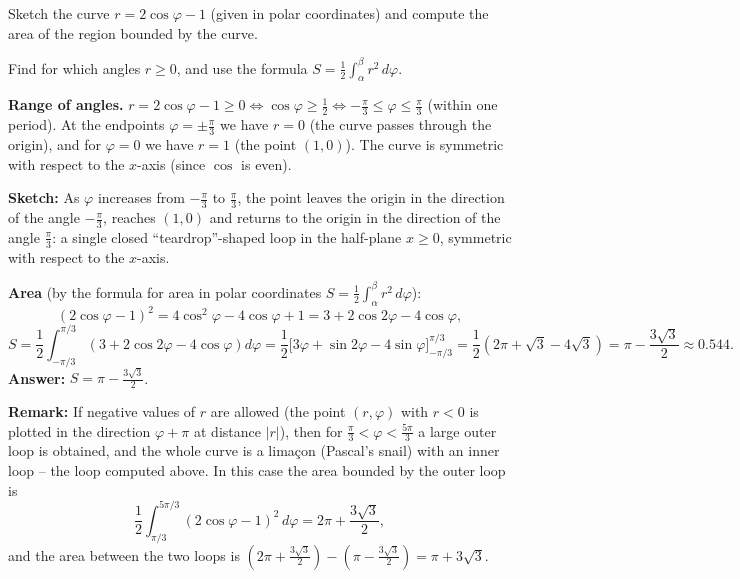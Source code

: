 
\begin{question}
Sketch the curve $r=2\cos\varphi-1$ (given in polar coordinates) and compute the area of the region bounded by the curve.
\end{question}

\begin{hint}
Find for which angles $r\ge0$, and use the formula $S=\frac12\int_\alpha^\beta r^2\,d\varphi$.
\end{hint}

\begin{solution}
\textbf{Range of angles.} $r=2\cos\varphi-1\ge0\iff\cos\varphi\ge\frac12\iff -\frac\pi3\le\varphi\le\frac\pi3$ (within one period). At the endpoints $\varphi=\pm\frac\pi3$ we have $r=0$ (the curve passes through the origin), and for $\varphi=0$ we have $r=1$ (the point $(1,0)$). The curve is symmetric with respect to the $x$-axis (since $\cos$ is even).

\textbf{Sketch:} As $\varphi$ increases from $-\frac\pi3$ to $\frac\pi3$, the point leaves the origin in the direction of the angle $-\frac\pi3$, reaches $(1,0)$ and returns to the origin in the direction of the angle $\frac\pi3$: a single closed ``teardrop''-shaped loop in the half-plane $x\ge0$, symmetric with respect to the $x$-axis.

\textbf{Area} (by the formula for area in polar coordinates $S=\frac12\int_\alpha^\beta r^2\,d\varphi$):
\[
(2\cos\varphi-1)^2=4\cos^2\varphi-4\cos\varphi+1=3+2\cos2\varphi-4\cos\varphi,
\]
\[
S=\frac12\int_{-\pi/3}^{\pi/3}\left(3+2\cos2\varphi-4\cos\varphi\right)d\varphi
=\frac12\Big[3\varphi+\sin2\varphi-4\sin\varphi\Big]_{-\pi/3}^{\pi/3}
=\frac12\left(2\pi+\sqrt3-4\sqrt3\right)=\pi-\frac{3\sqrt3}{2}\approx0.544.
\]
\textbf{Answer:} $S=\pi-\frac{3\sqrt3}{2}$.

\textbf{Remark:} If negative values of $r$ are allowed (the point $(r,\varphi)$ with $r<0$ is plotted in the direction $\varphi+\pi$ at distance $|r|$), then for $\frac\pi3<\varphi<\frac{5\pi}3$ a large outer loop is obtained, and the whole curve is a limaçon (Pascal's snail) with an inner loop -- the loop computed above. In this case the area bounded by the outer loop is
\[
\frac12\int_{\pi/3}^{5\pi/3}(2\cos\varphi-1)^2\,d\varphi=2\pi+\frac{3\sqrt3}{2},
\]
and the area between the two loops is $\left(2\pi+\frac{3\sqrt3}{2}\right)-\left(\pi-\frac{3\sqrt3}{2}\right)=\pi+3\sqrt3$.
\end{solution}
